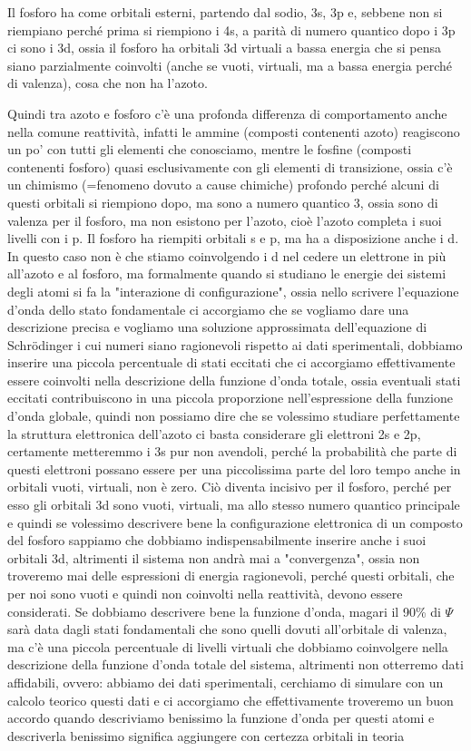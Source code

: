 Il fosforo ha come orbitali esterni, partendo dal sodio, 3s, 3p e, sebbene non si riempiano perché prima si riempiono i 4s, a parità di numero quantico dopo i 3p ci sono i 3d, ossia il fosforo ha orbitali 3d virtuali a bassa energia che si pensa siano parzialmente coinvolti (anche se vuoti, virtuali, ma a bassa energia perché di valenza), cosa che non ha l'azoto.

Quindi tra azoto e fosforo c'è una profonda differenza di comportamento anche nella comune reattività, infatti le ammine (composti contenenti azoto) reagiscono un po' con tutti gli elementi che conosciamo, mentre le fosfine (composti contenenti fosforo) quasi esclusivamente con gli elementi di transizione, ossia c'è un chimismo (=fenomeno dovuto a cause chimiche) profondo perché alcuni di questi orbitali si riempiono dopo, ma sono a numero quantico 3, ossia sono di valenza per il fosforo, ma non esistono per l'azoto, cioè l'azoto completa i suoi livelli con i p. Il fosforo ha riempiti orbitali s e p, ma ha a disposizione anche i d. In questo caso non è che stiamo coinvolgendo i d nel cedere un elettrone in più all'azoto e al fosforo, ma formalmente quando si studiano le energie dei sistemi degli atomi si fa la "interazione di configurazione", ossia nello scrivere l'equazione d'onda dello stato fondamentale ci accorgiamo che se vogliamo dare una descrizione precisa e vogliamo una soluzione approssimata dell'equazione di Schrödinger i cui numeri siano ragionevoli rispetto ai dati sperimentali, dobbiamo inserire una piccola percentuale di stati eccitati che ci accorgiamo effettivamente essere coinvolti nella descrizione della funzione d'onda totale, ossia eventuali stati eccitati contribuiscono in una piccola proporzione nell'espressione della funzione d'onda globale, quindi non possiamo dire che se volessimo studiare perfettamente la struttura elettronica dell'azoto ci basta considerare gli elettroni 2s e 2p, certamente metteremmo i 3s pur non avendoli, perché la probabilità che parte di questi elettroni possano essere per una piccolissima parte del loro tempo anche in orbitali vuoti, virtuali, non è zero. Ciò diventa incisivo per il fosforo, perché per esso gli orbitali 3d sono vuoti, virtuali, ma allo stesso numero quantico principale e quindi se volessimo descrivere bene la configurazione elettronica di un composto del fosforo sappiamo che dobbiamo indispensabilmente inserire anche i suoi orbitali 3d, altrimenti il sistema non andrà mai a "convergenza", ossia non troveremo mai delle espressioni di energia ragionevoli, perché questi orbitali, che per noi sono vuoti e quindi non coinvolti nella reattività, devono essere considerati. Se dobbiamo descrivere bene la funzione d'onda, magari il 90\% di $\Psi$ sarà data dagli stati fondamentali che sono quelli dovuti all'orbitale di valenza, ma c'è una piccola percentuale di livelli virtuali che dobbiamo coinvolgere nella descrizione della funzione d'onda totale del sistema, altrimenti non otterremo dati affidabili, ovvero: abbiamo dei dati sperimentali, cerchiamo di simulare con un calcolo teorico questi dati e ci accorgiamo che effettivamente troveremo un buon accordo quando descriviamo benissimo la funzione d'onda per questi atomi e descriverla benissimo significa aggiungere con certezza orbitali in teoria 
